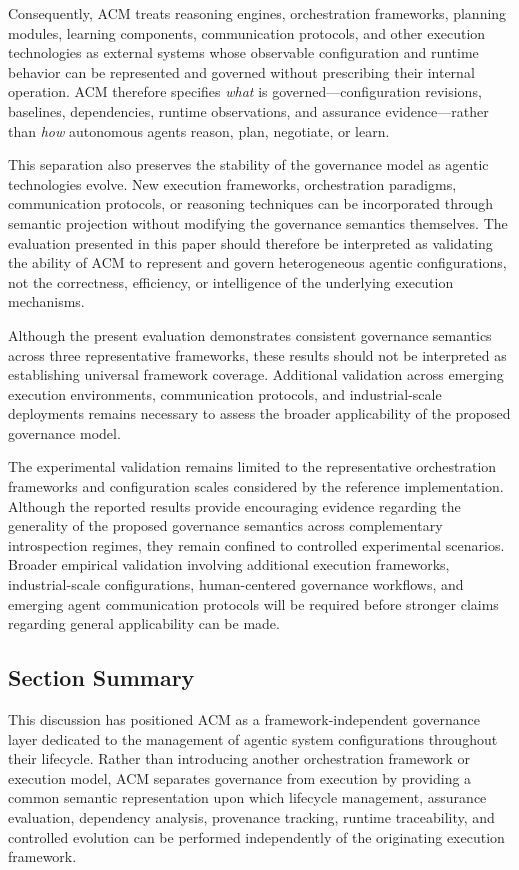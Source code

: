 \documentclass[10pt]{article}
\begin{document}
Consequently, ACM treats reasoning engines, orchestration frameworks, planning modules, learning components, communication protocols, and other execution technologies as external systems whose observable configuration and runtime behavior can be represented and governed without prescribing their internal operation. ACM therefore specifies \emph{what} is governed---configuration revisions, baselines, dependencies, runtime observations, and assurance evidence---rather than \emph{how} autonomous agents reason, plan, negotiate, or learn.

This separation also preserves the stability of the governance model as agentic technologies evolve. New execution frameworks, orchestration paradigms, communication protocols, or reasoning techniques can be incorporated through semantic projection without modifying the governance semantics themselves. The evaluation presented in this paper should therefore be interpreted as validating the ability of ACM to represent and govern heterogeneous agentic configurations, not the correctness, efficiency, or intelligence of the underlying execution mechanisms.

Although the present evaluation demonstrates consistent governance semantics across three representative frameworks, these results should not be interpreted as establishing universal framework coverage. Additional validation across emerging execution environments, communication protocols, and industrial-scale deployments remains necessary to assess the broader applicability of the proposed governance model.

The experimental validation remains limited to the representative orchestration frameworks and configuration scales considered by the reference implementation. Although the reported results provide encouraging evidence regarding the generality of the proposed governance semantics across complementary introspection regimes, they remain confined to controlled experimental scenarios. Broader empirical validation involving additional execution frameworks, industrial-scale configurations, human-centered governance workflows, and emerging agent communication protocols will be required before stronger claims regarding general applicability can be made.

\subsection{Section Summary}

This discussion has positioned ACM as a framework-independent governance layer dedicated to the management of agentic system configurations throughout their lifecycle. Rather than introducing another orchestration framework or execution model, ACM separates governance from execution by providing a common semantic representation upon which lifecycle management, assurance evaluation, dependency analysis, provenance tracking, runtime traceability, and controlled evolution can be performed independently of the originating execution framework.
\end{document}
